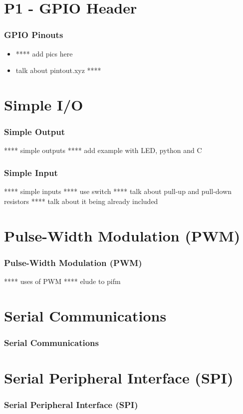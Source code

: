 \documentclass[slidestop,usepdftitle=false,14pt,table]{beamer}
\begin{document}
\section{P1 - GPIO Header}
\begin{frame}
\frametitle{GPIO Pinouts}
\begin{itemize}
\item **** add pics here
\item talk about pintout.xyz ****
\end{itemize}
\end{frame}

\section{Simple I/O}
\begin{frame}
\frametitle{Simple Output}
**** simple outputs
**** add example with LED, python and C
\end{frame}

\begin{frame}
\frametitle{Simple Input}
**** simple inputs
**** use switch 
**** talk about pull-up and pull-down resistors
**** talk about it being already included
\end{frame}

\section{Pulse-Width Modulation (PWM)}
\begin{frame}
\frametitle{Pulse-Width Modulation (PWM)}
**** uses of PWM
**** elude to pifm
\end{frame}

\section{Serial Communications}
\begin{frame}
\frametitle{Serial Communications}


\end{frame}



\section{Serial Peripheral Interface (SPI)}
\begin{frame}
\frametitle{Serial Peripheral Interface (SPI)}


\end{frame}
\end{document}
